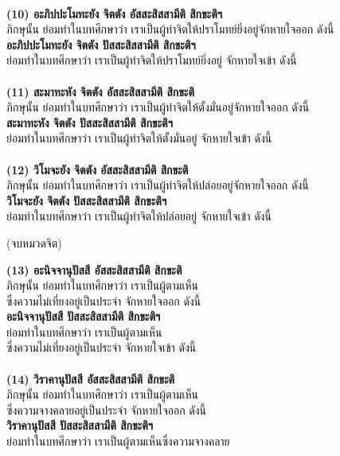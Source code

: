 \documentclass[12pt]{article}
\begin{document}
\\
\textbf{(10) อะภิปปะโมทะยัง จิตตัง อัสสะสิสสามีติ สิกขะติฯ}\\
\indent ภิกษุนั้น ย่อมทำในบทศึกษาว่า เราเป็นผู้ทำจิตให้ปราโมทย์ยิ่งอยู่จักหายใจออก ดังนี้\\
\textbf{อะภิปปะโมทะยัง จิตตัง ปัสสะสิสสามีติ สิกขะติฯ}\\
\indent ย่อมทำในบทศึกษาว่า เราเป็นผู้ทำจิตให้ปราโมทย์ยิ่งอยู่ จักหายใจเข้า ดังนี้\\
\\
\textbf{(11) สะมาทะหัง จิตตัง อัสสะสิสสามีติ สิกขะติ}\\
\indent ภิกษุนั้น ย่อมทำในบทศึกษาว่า เราเป็นผู้ทำจิตให้ตั้งมั่นอยู่จักหายใจออก ดังนี้\\
\textbf{สะมาทะหัง จิตตัง ปัสสะสิสสามีติ สิกขะติฯ}\\
\indent ย่อมทำในบทศึกษาว่า เราเป็นผู้ทำจิตให้ตั้งมั่นอยู่ จักหายใจเข้า ดังนี้\\
\\
\textbf{(12) วิโมจะยัง จิตตัง อัสสะสิสสามีติ สิกขะติ}\\
\indent ภิกษุนั้น ย่อมทำในบทศึกษาว่า เราเป็นผู้ทำจิตให้ปล่อยอยู่จักหายใจออก ดังนี้\\
\textbf{วิโมจะยัง จิตตัง ปัสสะสิสสามีติ สิกขะติฯ}\\
\indent ย่อมทำในบทศึกษาว่า เราเป็นผู้ทำจิตให้ปล่อยอยู่ จักหายใจเข้า ดังนี้
\begin{center}
(จบหมวดจิต)
\end{center}
\textbf{(13) อะนิจจานุปัสสี อัสสะสิสสามีติ สิกขะติ}\\
\indent ภิกษุนั้น ย่อมทำในบทศึกษาว่า เราเป็นผู้ตามเห็น\\
\indent ซึ่งความไม่เที่ยงอยู่เป็นประจำ จักหายใจออก ดังนี้\\
\textbf{อะนิจจานุปัสสี ปัสสะสิสสามีติ สิกขะติฯ}\\
\indent ย่อมทำในบทศึกษาว่า เราเป็นผู้ตามเห็น\\
\indent ซึ่งความไม่เที่ยงอยู่เป็นประจำ จักหายใจเข้า ดังนี้\\
\\
\textbf{(14) วิราคานุปัสสี อัสสะสิสสามีติ สิกขะติ}\\
\indent ภิกษุนั้น ย่อมทำในบทศึกษาว่า เราเป็นผู้ตามเห็น\\
\indent ซึ่งความจางคลายอยู่เป็นประจำ จักหายใจออก ดังนี้\\
\textbf{วิราคานุปัสสี ปัสสะสิสสามีติ สิกขะติฯ}\\
\indent ย่อมทำในบทศึกษาว่า เราเป็นผู้ตามเห็นซึ่งความจางคลาย\\
\end{document}

